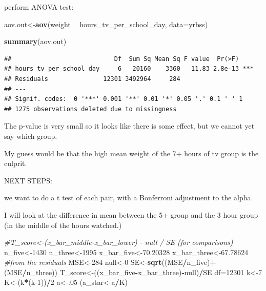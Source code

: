 \documentclass[
]{article}
\newenvironment{Shaded}{\begin{snugshade}}{\end{snugshade}}
\newcommand{\CommentTok}[1]{\textcolor[rgb]{0.56,0.35,0.01}{\textit{#1}}}
\newcommand{\DataTypeTok}[1]{\textcolor[rgb]{0.13,0.29,0.53}{#1}}
\newcommand{\DecValTok}[1]{\textcolor[rgb]{0.00,0.00,0.81}{#1}}
\newcommand{\FloatTok}[1]{\textcolor[rgb]{0.00,0.00,0.81}{#1}}
\newcommand{\KeywordTok}[1]{\textcolor[rgb]{0.13,0.29,0.53}{\textbf{#1}}}
\newcommand{\NormalTok}[1]{#1}
\newcommand{\OperatorTok}[1]{\textcolor[rgb]{0.81,0.36,0.00}{\textbf{#1}}}
\newcommand{\StringTok}[1]{\textcolor[rgb]{0.31,0.60,0.02}{#1}}
\begin{document}
perform ANOVA test:

\begin{Shaded}
\begin{Highlighting}[]
\NormalTok{aov.out<-}\KeywordTok{aov}\NormalTok{(weight }\OperatorTok{~}\StringTok{ }\NormalTok{hours_tv_per_school_day, }\DataTypeTok{data=}\NormalTok{yrbss)}

\KeywordTok{summary}\NormalTok{(aov.out)}
\end{Highlighting}
\end{Shaded}

\begin{verbatim}
##                            Df  Sum Sq Mean Sq F value  Pr(>F)    
## hours_tv_per_school_day     6   20160    3360   11.83 2.8e-13 ***
## Residuals               12301 3492964     284                    
## ---
## Signif. codes:  0 '***' 0.001 '**' 0.01 '*' 0.05 '.' 0.1 ' ' 1
## 1275 observations deleted due to missingness
\end{verbatim}

The p-value is very small so it looks like there is some effect, but we
cannot yet say which group.

My guess would be that the high mean weight of the 7+ hours of tv group
is the culprit.

NEXT STEPS:

we want to do a t test of each pair, with a Bonferroni adjustment to the
alpha.

I will look at the difference in mean between the 5+ group and the 3
hour group (in the middle of the hours watched.)

\begin{Shaded}
\begin{Highlighting}[]
\CommentTok{#T_score<-(x_bar_middle-x_bar_lower) - null / SE (for comparisons)}
\NormalTok{n_five<-}\DecValTok{1430}
\NormalTok{n_three<-}\DecValTok{1995}
\NormalTok{x_bar_five<-}\FloatTok{70.20328}
\NormalTok{x_bar_three<-}\FloatTok{67.78624}   
\CommentTok{#from the residuals}
\NormalTok{MSE<-}\DecValTok{284}
\NormalTok{null<-}\DecValTok{0}
\NormalTok{SE<-}\KeywordTok{sqrt}\NormalTok{((MSE}\OperatorTok{/}\NormalTok{n_five)}\OperatorTok{+}\NormalTok{(MSE}\OperatorTok{/}\NormalTok{n_three))}
\NormalTok{T_score<-((x_bar_five}\OperatorTok{-}\NormalTok{x_bar_three)}\OperatorTok{-}\NormalTok{null)}\OperatorTok{/}\NormalTok{SE}
\NormalTok{df=}\DecValTok{12301}
\NormalTok{k<-}\DecValTok{7}
\NormalTok{K<-(k}\OperatorTok{*}\NormalTok{(k}\DecValTok{-1}\NormalTok{))}\OperatorTok{/}\DecValTok{2}
\NormalTok{a<-.}\DecValTok{05}
\NormalTok{(a_star<-a}\OperatorTok{/}\NormalTok{K)}
\end{Highlighting}
\end{Shaded}
\end{document}
